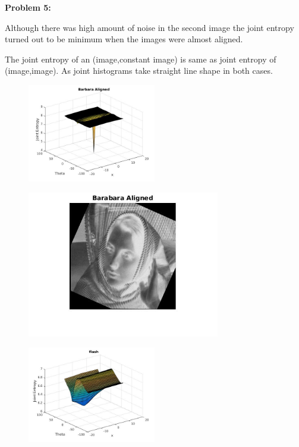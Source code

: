 \documentclass[a4paper]{article}
\begin{document}
\textbf{\newline Problem 5:}

Although there was high amount of noise in the second image the joint entropy turned out to be minimum when the images were almost aligned.

The joint entropy of an (image,constant image) is same as joint entropy of (image,image). As joint histograms take straight line shape in both cases.   


\begin{figure}[ht!]
 \centering
\includegraphics[width=0.5\textwidth]{Q5/output/barbara_je.jpg}
\end{figure}
\begin{figure}[ht!]
 \centering
\includegraphics[width=0.75\textwidth]{Q5/output/Barbara_aligned.jpg}
\end{figure}
\begin{figure}[ht!]
 \centering
\includegraphics[width=0.5\textwidth]{Q5/output/noflash_je.jpg}
\end{figure}
\end{document}
